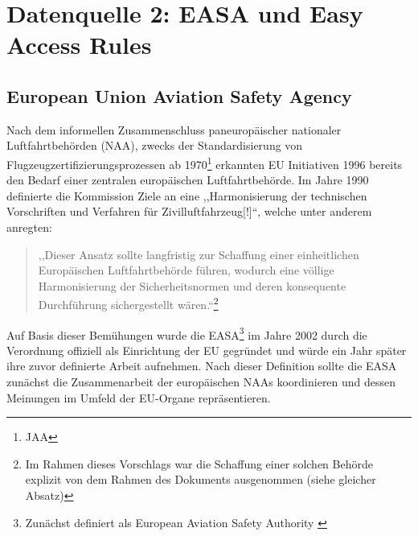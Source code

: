 \chapter{Datenquelle 2: EASA und Easy Access Rules}

    \section{European Union Aviation Safety Agency}


Nach dem informellen Zusammenschluss paneuropäischer nationaler Luftfahrtbehörden (\acs{NAA}), zwecks der Standardisierung von Flugzeugzertifizierungsprozessen ab 1970\footnote{\acf{JAA}} erkannten \ac{EU} Initiativen 1996 bereits den Bedarf einer zentralen europäischen Luftfahrtbehörde.
Im Jahre 1990 definierte die Kommission Ziele an eine ,,Harmonisierung der technischen Vorschriften und Verfahren für Zivilluftfahrzeug[!]``\cite{kom_90_442}, welche unter anderem anregten: 

\begin{quote}
    ,,Dieser Ansatz sollte langfristig zur Schaffung einer einheitlichen Europäischen Luftfahrtbehörde führen, wodurch eine völlige Harmonisierung der Sicherheitsnormen und deren konsequente Durchführung sichergestellt wären.``\footnote{Im Rahmen dieses Vorschlags war die Schaffung einer solchen Behörde explizit von dem Rahmen des Dokuments ausgenommen (siehe gleicher Absatz)} \cite[Begr. Art. 7 Abs. 2]{kom_90_442}
\end{quote}
Auf Basis dieser Bemühungen wurde die \acf{EASA}\footnote{Zunächst definiert als European Aviation Safety Authority \cite[2]{easa_framework}} im Jahre 2002 durch die Verordnung  offiziell als Einrichtung der \ac{EU} gegründet und würde ein Jahr später ihre zuvor definierte Arbeit aufnehmen.
Nach dieser Definition sollte die \ac{EASA} zunächst die Zusammenarbeit der europäischen \acsp{NAA} koordinieren und dessen Meinungen im Umfeld der \ac{EU}-Organe repräsentieren. 
\cite[§4.3]{easa_coman2018}



